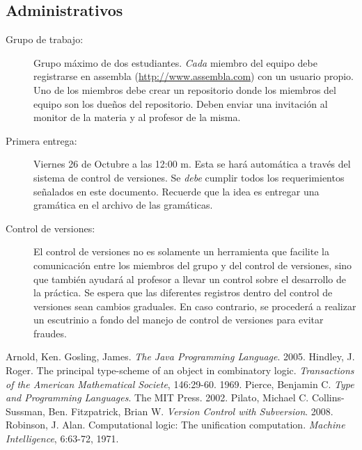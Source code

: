\documentclass{article}
\begin{document}
\subsection{Administrativos}
\label{sec:admin}

\begin{description}
\item[Grupo de trabajo:] Grupo máximo de dos estudiantes. \emph{Cada}
  miembro del equipo debe registrarse en assembla
  (\url{http://www.assembla.com}) con un usuario propio. Uno de los
  miembros debe crear un repositorio donde los miembros del equipo son
  los dueños del repositorio. Deben enviar una invitación al monitor
  de la materia y al profesor de la misma.
\item[Primera entrega:] Viernes 26 de Octubre a las 12:00 m. Esta se
  hará automática a través del sistema de control de versiones. Se
  \emph{debe} cumplir todos los requerimientos señalados en este
  documento. Recuerde que la idea es entregar una gramática en el
  archivo de las gramáticas.
\item[Control de versiones:] El control de versiones no es solamente
  un herramienta que facilite la comunicación entre los miembros del
  grupo y del control de versiones, sino que también ayudará al
  profesor a llevar un control sobre el desarrollo de la práctica. Se
  espera que las diferentes registros dentro del control de versiones
  sean cambios graduales. En caso contrario, se procederá a realizar
  un escutrinio a fondo del manejo de control de versiones para evitar
  fraudes.
\end{description}

\renewcommand{\refname}{Bibliografía}

\begin{thebibliography}{9}
 Arnold, Ken. Gosling, James. \emph{The Java
    Programming Language}. 2005.
 Hindley, J. Roger. The principal type-scheme of an
  object in combinatory logic. \emph{Transactions of the American
    Mathematical Societe}, 146:29-60. 1969.
 Pierce, Benjamin C. \emph{Type and Programming Languages}. The MIT Press. 2002.
 Pilato, Michael C. Collins-Sussman, Ben. Fitzpatrick, Brian W. \emph{Version Control with Subversion}. 2008.
 Robinson, J. Alan. Computational logic: The unification computation. \emph{Machine Intelligence}, 6:63-72, 1971.

\end{thebibliography}
\end{document}
